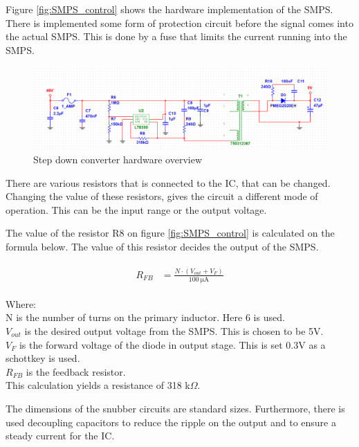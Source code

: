 Figure \vref{fig:SMPS_control} shows the hardware implementation of the SMPS. There is implemented some form of protection circuit before the signal comes into the actual SMPS. This is done by a fuse that limits the current running into the SMPS. 

\begin{figure}[H]
	\centering
	\includegraphics[width=1\linewidth]{Hardware/Pictures/SMPS_hw}
	\caption{Step down converter hardware overview}
	\label{fig:SMPS_control}
\end{figure}

There are various resistors that is connected to the IC, that can be changed. Changing the value of these resistors, gives the circuit a different mode of operation. This can be the input range or the output voltage. 

The value of the resistor R8 on figure \vref{fig:SMPS_control} is calculated on the formula below. The value of this resistor decides the output of the SMPS.

\begin{align}
	\begin{split}
		R_{FB} &= \frac{N \cdot (V_{out}+V_F)}{\SI{100}{\micro \ampere}}
	\end{split}
\end{align}

Where:\\
N is the number of turns on the primary inductor. Here 6 is used. \\
$V_{out}$ is the desired output voltage from the SMPS. This is chosen to be 5V. \\
$V_F$ is the forward voltage of the diode in output stage. This is set 0.3V as a schottkey is used. \\
$R_{FB}$ is the feedback resistor. \\
This calculation yields a resistance of 318 k$\Omega$.

The dimensions of the snubber circuits are standard sizes. Furthermore, there is used decoupling capacitors to reduce the ripple on the output and to ensure a steady current for the IC.


